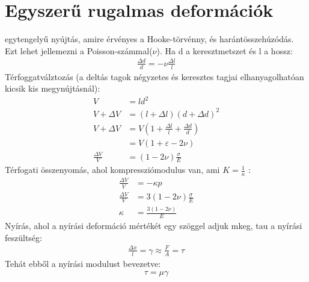 \documentclass{article}
\begin{document}
\section{Egyszerű rugalmas deformációk}
egytengelyű nyújtás, amire érvényes a Hooke-törvénny, és harántösszehúzódás.
Ezt lehet jellemezni a Poisson-számmal($\nu$). Ha d a keresztmetszet és l  a hossz: 
\begin{align*}
\frac{\Delta d}{d} = - \nu \frac{\Delta l}{l}
\end{align*}
Térfoggatválztozás (a deltás tagok négyzetes és keresztes tagjai elhanyagolhatóan kicsik kis megynújtásnál):
\begin{align*}
V&=ld^2 \\
V+\Delta V &= (l+\Delta l)(d+ \Delta d)^2 \\
V+\Delta V &= V(1+\frac{\Delta l}{l } + \frac{\Delta d}{ d}) \\
&= V(1+\varepsilon -2 \nu ) \\
\frac{\Delta V}{V} &= (1-2\nu) \frac{\sigma}{E}
\end{align*}
Térfogati összenyomás, ahol kompressziómodulus van, ami $K = \frac{1}{\kappa}$ : 
\begin{align*}
\frac{\Delta V}{V} &= -\kappa p \\
\frac{\Delta V}{V} &= 3(1-2\nu) \frac{\sigma}{E}\\
\kappa &= \frac{3(1-2\nu)}{E}
\end{align*}
Nyírás, ahol a nyírási deformáció mértékét egy szöggel adjuk mkeg, tau a nyírási feszültség:
\begin{align*}
\frac{\Delta x}{l} = \gamma \approx \frac{F}{A} = \tau 
\end{align*}
Tehát ebből a nyírási modulust bevezetve:
\begin{align*}
\tau = \mu \gamma
\end{align*}
\newpage
\end{document}
